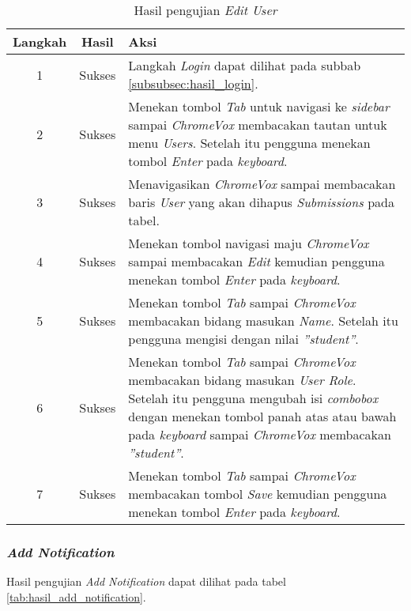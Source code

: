 \begin{table}[H]
	\centering
	\caption{Hasil pengujian \textit{Edit User}}
	\label{tab:hasil_edit_user}
	\begin{tabular}{|c|c|p{12cm}|}
		\toprule
		Langkah & Hasil & Aksi\\
		\midrule
		1 & Sukses & Langkah \textit{Login} dapat dilihat pada subbab \ref{subsubsec:hasil_login}.\\
		2 & Sukses & Menekan tombol \textit{Tab} untuk navigasi ke \textit{sidebar} sampai \textit{ChromeVox} membacakan tautan untuk menu \textit{Users}. Setelah itu pengguna menekan tombol \textit{Enter} pada \textit{keyboard}.\\
		3 & Sukses & Menavigasikan \textit{ChromeVox} sampai membacakan baris \textit{User} yang akan dihapus \textit{Submissions} pada tabel.\\
		4 & Sukses & Menekan tombol navigasi maju \textit{ChromeVox} sampai membacakan \textit{Edit} kemudian pengguna menekan tombol \textit{Enter} pada \textit{keyboard}.\\
		5 & Sukses & Menekan tombol \textit{Tab} sampai \textit{ChromeVox} membacakan bidang masukan \textit{Name}. Setelah itu pengguna mengisi dengan nilai \textit{''student''}.\\
		6 & Sukses & Menekan tombol \textit{Tab} sampai \textit{ChromeVox} membacakan bidang masukan \textit{User Role}. Setelah itu pengguna mengubah isi \textit{combobox} dengan menekan tombol panah atas atau bawah pada \textit{keyboard} sampai \textit{ChromeVox} membacakan \textit{''student''}.\\
		7 & Sukses & Menekan tombol \textit{Tab} sampai \textit{ChromeVox} membacakan tombol \textit{Save} kemudian pengguna menekan tombol \textit{Enter} pada \textit{keyboard}.\\
		\bottomrule
	\end{tabular}
\end{table}

\subsubsection{\textit{Add Notification}}
\label{subsubsec:hasil_add_notification}
Hasil pengujian \textit{Add Notification} dapat dilihat pada tabel \ref{tab:hasil_add_notification}.

